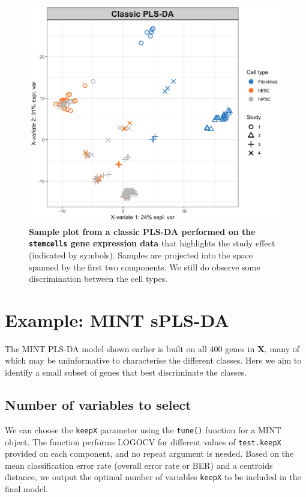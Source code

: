 \documentclass[]{book}
\begin{document}
\begin{figure}

{\centering \includegraphics[width=0.5\linewidth]{Figures/MINT/stem-plsda-indiv-1} 

}

\caption{\textbf{Sample plot from a classic PLS-DA performed on the \texttt{stemcells} gene expression data} that highlights the study effect (indicated by symbols). Samples are projected into the space spanned by the first two components. We still do observe some discrimination between the cell types.}\label{fig:stem-plsda-indiv}
\end{figure}



\hypertarget{mint:splsda}{%
\section{Example: MINT sPLS-DA}\label{mint:splsda}}

The MINT PLS-DA model shown earlier is built on all 400 genes in \(\boldsymbol X\), many of which may be uninformative to characterise the different classes. Here we aim to identify a small subset of genes that best discriminate the classes.

\hypertarget{number-of-variables-to-select}{%
\subsection{Number of variables to select}\label{number-of-variables-to-select}}

We can choose the \texttt{keepX} parameter using the \texttt{tune()} function for a MINT object. The function performs LOGOCV for different values of \texttt{test.keepX} provided on each component, and no repeat argument is needed. Based on the mean classification error rate (overall error rate or BER) and a centroids distance, we output the optimal number of variables \texttt{keepX} to be included in the final model.
\end{document}
